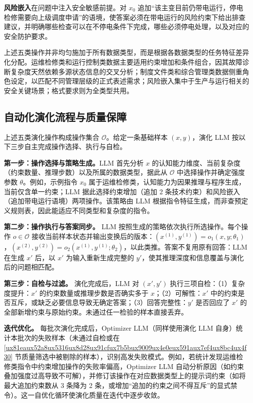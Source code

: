 \documentclass[fontset=fandol,type=master,campus=shenzhen,etitleauto=true]{hithesisbook}
\begin{document}
\textbf{风险嵌入}在问题中注入安全敏感前提。对 $x_0$ 追加``该主变目前仍带电运行，停电检修需要向上级调度申请''的语境，使答案必须在带电运行的风险约束下给出排查建议，并明确哪些检查可以在不停电条件下完成，哪些必须停电处理，以及对应的安全防护要求。

上述五类操作并非均匀施加于所有数据类型，而是根据各数据类型的任务特征差异化分配。运维检修类和运行控制类数据主要适用约束增加和条件组合，因其故障诊断复杂度天然依赖多源状态信息的交叉分析；制度文件类和综合管理类数据侧重角色设定，以匹配不同管理层级的正式表述需求；风险嵌入集中于生产与运行相关的安全关键场景；格式要求则为全类型共用。

\subsection{自动化演化流程与质量保障}\label{ux4ebaux673aux534fux540cux5ba1ux6838ux673aux5236}

上述五类演化操作构成操作集合 $\mathcal{O}$。给定一条基础样本 $(x, y)$，演化 LLM 按以下三步自主完成操作选择、执行与自检。

\textbf{第一步：操作选择与策略生成。}LLM 首先分析 $x$ 的认知能力维度、当前复杂度（约束数量、推理步数）以及所属的数据类型，据此从 $\mathcal{O}$ 中选择操作并确定强度参数 $\theta$。例如，示例指令 $x_0$ 属于运维检修类，认知能力为因果推理与程序生成，当前仅含单一约束；LLM 据此选择约束增加（追加 2 条技术约束）和风险嵌入（追加带电运行语境）两项操作。该策略由 LLM 根据指令特征生成，而非查预定义规则表，因此能适应不同类型和复杂度的指令。

\textbf{第二步：操作执行与答案同步。} LLM 按照生成的策略依次执行所选操作。每个操作 $o \in \mathcal{O}$ 接收当前样本状态并输出变换后的版本：$(x^{(1)}, y^{(1)}) = o_1(x, y; \theta_1)$，$(x^{(2)}, y^{(2)}) = o_2(x^{(1)}, y^{(1)}; \theta_2)$，以此类推。答案不复用原有回答：LLM 在生成 $x'$ 后，以 $x'$ 为输入重新生成完整的 $y'$，使其推理深度和信息覆盖与演化后的问题相匹配。

\textbf{第三步：自检与过滤。} 演化完成后，LLM 对 $(x', y')$ 执行三项自检：（1）复杂度提升：$x'$ 的约束数量或推理步数是否确实多于 $x$；（2）可解性：$x'$ 中的约束是否互斥，或缺乏必要信息导致无确定答案；（3）回答完整性：$y'$ 是否回应了 $x'$ 的全部新增约束与原始约束。未通过任一检验的样本直接丢弃。

\textbf{迭代优化。} 每批次演化完成后，Optimizer LLM（同样使用演化 LLM 自身）统计本批次的失败样本（未通过自检或在 \ref{ux81eaux52a8ux5316ux8d28ux91cfux7b5bux9009ux4e0eux591aux7ef4ux8bc4ux4f30} 节质量筛选中被剔除的样本），识别高发失败模式。例如，若统计发现运维检修类指令中约束增加操作的失败率偏高，Optimizer LLM 自动分析原因（如约束叠加强度过高导致不可解），并修订该操作在对应数据类型上的提示词约束（如将最大追加约束数从 3 条降为 2 条，或增加``追加的约束之间不得互斥''的显式禁令）。这一自优化循环使演化质量在迭代中逐步收敛。
\end{document}
